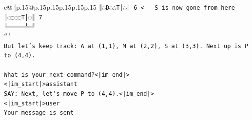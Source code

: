 \documentclass{article}
\begin{document}
{\begin{supertabular}{c@{$\;$}|p{.15\linewidth}@{}p{.15\linewidth}p{.15\linewidth}p{.15\linewidth}p{.15\linewidth}p{.15\linewidth}}
{{{\texttt{║◌D◌◌T│◌║ 6   <{-}{-} S is now gone from here} \\
\texttt{║◌◌◌◌T│◌║ 7} \\
\texttt{╚═════╧═╝} \\
\texttt{```} \\
\texttt{But let's keep track: A at (1,1), M at (2,2), S at (3,3). Next up is P to (4,4).} \\
\\ 
\texttt{What is your next command?<|im\_end|>} \\
\texttt{<|im\_start|>assistant} \\
\texttt{SAY: Next, let's move P to (4,4).<|im\_end|>} \\
\texttt{<|im\_start|>user} \\
\texttt{Your message is sent} \\
            }
        }
    }
     \\ \\


\end{supertabular}}
\end{document}
